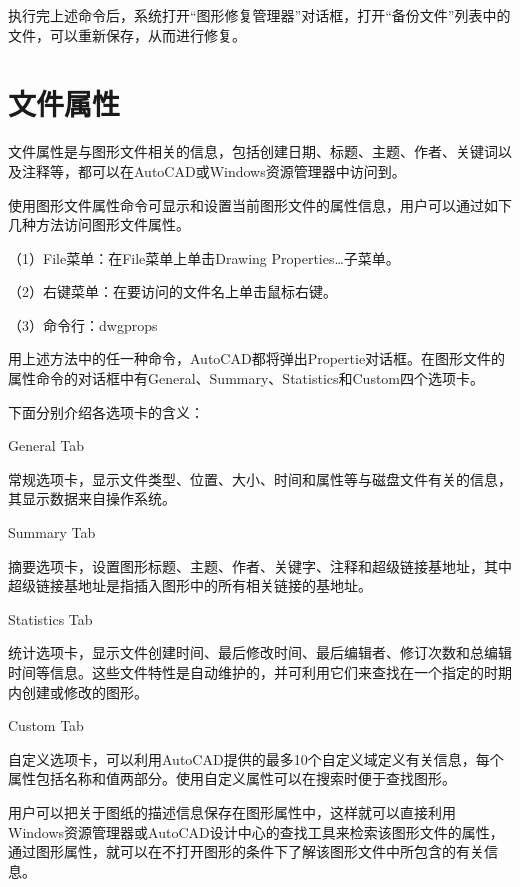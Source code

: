 执行完上述命令后，系统打开“图形修复管理器”对话框，打开“备份文件”列表中的文件，可以重新保存，从而进行修复。


\chapter{文件属性}

文件属性是与图形文件相关的信息，包括创建日期、标题、主题、作者、关键词以及注释等，都可以在AutoCAD或Windows资源管理器中访问到。

使用图形文件属性命令可显示和设置当前图形文件的属性信息，用户可以通过如下几种方法访问图形文件属性。

（1）File菜单：在File菜单上单击Drawing Properties…子菜单。

（2）右键菜单：在要访问的文件名上单击鼠标右键。

（3）命令行：dwgprops

用上述方法中的任一种命令，AutoCAD都将弹出Propertie对话框。在图形文件的属性命令的对话框中有General、Summary、Statistics和Custom四个选项卡。

下面分别介绍各选项卡的含义：

\begin{compactenum}
\item General Tab

常规选项卡，显示文件类型、位置、大小、时间和属性等与磁盘文件有关的信息，其显示数据来自操作系统。

\item Summary Tab

摘要选项卡，设置图形标题、主题、作者、关键字、注释和超级链接基地址，其中超级链接基地址是指插入图形中的所有相关链接的基地址。

\item Statistics Tab

统计选项卡，显示文件创建时间、最后修改时间、最后编辑者、修订次数和总编辑时间等信息。这些文件特性是自动维护的，并可利用它们来查找在一个指定的时期内创建或修改的图形。

\item Custom Tab

自定义选项卡，可以利用AutoCAD提供的最多10个自定义域定义有关信息，每个属性包括名称和值两部分。使用自定义属性可以在搜索时便于查找图形。
\end{compactenum}

用户可以把关于图纸的描述信息保存在图形属性中，这样就可以直接利用Windows资源管理器或AutoCAD设计中心的查找工具来检索该图形文件的属性，通过图形属性，就可以在不打开图形的条件下了解该图形文件中所包含的有关信息。

